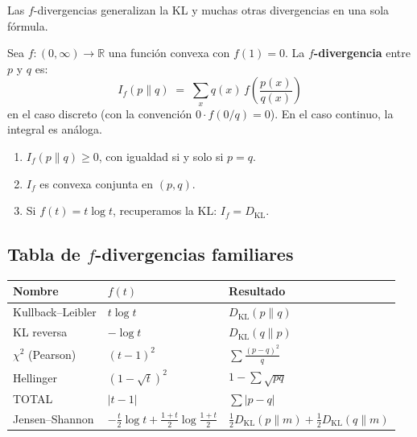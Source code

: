 Las $f$-divergencias generalizan la KL y muchas otras divergencias en una sola fórmula.

\begin{definition}
	Sea $f: (0,\infty) \to \mathbb{R}$ una función convexa con $f(1) = 0$.  La \textbf{$f$-divergencia} entre $p$ y $q$ es:
	\[
	I_f(p \| q) \;=\; \sum_x q(x) \, f\!\left(\frac{p(x)}{q(x)}\right)
	\]
	en el caso discreto (con la convención $0 \cdot f(0/q) = 0$).  En el caso continuo, la integral es análoga.
\end{definition}

\begin{theorem}
	\begin{enumerate}
		\item $I_f(p \| q) \ge 0$, con igualdad si y solo si $p = q$.
		\item $I_f$ es convexa conjunta en $(p, q)$.
		\item Si $f(t) = t \log t$, recuperamos la KL: $I_f = D_{\mathrm{KL}}$.
	\end{enumerate}
\end{theorem}

\subsection{Tabla de $f$-divergencias familiares}

\begin{center}
	\renewcommand{\arraystretch}{1.4}
	\setlength{\tabcolsep}{8pt}
	\begin{tabular}{|l|l|l|}
		\hline
		\rowcolor{Accent!20}
		\textbf{Nombre} & \textbf{$f(t)$} & \textbf{Resultado} \\
		\hline
		Kullback--Leibler & $t \log t$ & $D_{\mathrm{KL}}(p \| q)$ \\
		\hline
		KL reversa & $-\log t$ & $D_{\mathrm{KL}}(q \| p)$ \\
		\hline
		$\chi^2$ (Pearson) & $(t-1)^2$ & $\sum \frac{(p-q)^2}{q}$ \\
		\hline
		Hellinger & $(1-\sqrt{t})^2$ & $1 - \sum \sqrt{pq}$ \\
		\hline
		TOTAL & $|t-1|$ & $\sum |p-q|$ \\
		\hline
		Jensen--Shannon & $-\frac{t}{2}\log t + \frac{1+t}{2}\log\frac{1+t}{2}$ & $\frac{1}{2}D_{\mathrm{KL}}(p \| m) + \frac{1}{2}D_{\mathrm{KL}}(q \| m)$ \\
		\hline
	\end{tabular}
\end{center}

